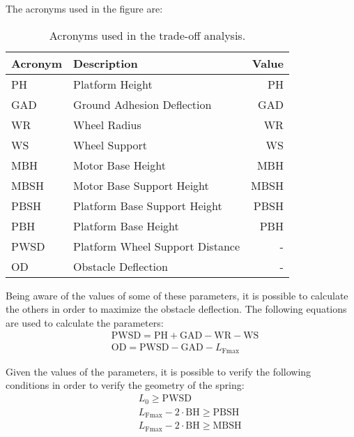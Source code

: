 \documentclass[11pt]{article}
\begin{document}
\newpage
\noindent
The acronyms used in the figure are:
\begin{table}[H]
    \centering
    \begin{tabular}{|l|l|r|}
        \rowcolor{blue!5}
        \hline
        \textbf{Acronym} & \textbf{Description} & \textbf{Value} \\
        \hline
        PH    & Platform Height                  & {{PH}} \\
        GAD   & Ground Adhesion Deflection       & {{GAD}} \\
        WR    & Wheel Radius                     & {{WR}} \\
        WS    & Wheel Support                    & {{WS}} \\
        MBH   & Motor Base Height                & {{MBH}} \\
        MBSH  & Motor Base Support Height        & {{MBSH}} \\
        PBSH  & Platform Base Support Height     & {{PBSH}} \\
        PBH   & Platform Base Height             & {{PBH}} \\
        PWSD  & Platform Wheel Support Distance  & -\\
        OD    & Obstacle Deflection              & -\\
        \hline
    \end{tabular}
    \caption{Acronyms used in the trade-off analysis.}
    \label{tab:trade_off_analysis_acronyms}
\end{table}

Being aware of the values of some of these parameters, it is possible to calculate the others in order to maximize the obstacle deflection. The following equations are used to calculate the parameters:
\begin{align}
    & \text{PWSD} = \text{PH} + \text{GAD} - \text{WR} - \text{WS} \\
    & \text{OD} = \text{PWSD} - \text{GAD} - L_ \text{Fmax}
\end{align}

Given the values of the parameters, it is possible to verify the following conditions in order to verify the geometry of the spring:
\begin{align}
    & \quad  L_0 \geq \text{PWSD} \\
    & \quad  L_\text{Fmax} - 2 \cdot \text{BH} \geq \text{PBSH} \\
    & \quad  L_\text{Fmax} - 2 \cdot \text{BH} \geq \text{MBSH}
\end{align}
\end{document}
